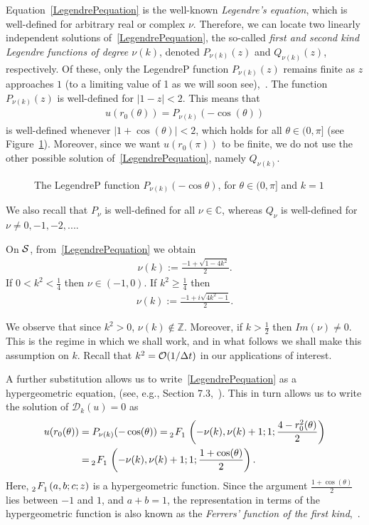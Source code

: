 Equation~\eqref{LegendrePequation} is the well-known {\it Legendre's
equation}, which is well-defined for arbitrary real or complex $\nu$.
Therefore, we can locate two linearly independent solutions
of~\eqref{LegendrePequation}, the so-called {\it first and second kind
Legendre functions of degree $\nu(k)$}, denoted $ P_{\nu(k)}(z)$ and
$Q_{\nu(k)}(z)$, respectively. Of these, only the  LegendreP function
$P_{\nu(k)}(z)$ remains finite as $z$ approaches $1$ (to a limiting
value of 1 as we will soon see),~\cite{lebedev}.  The function
$P_{\nu(k)}(z)$ is well-defined for $|1-z|<2$.  This means that
\begin{align*}
  u(r_0(\theta)) =  P_{\nu(k)}(-\cos(\theta))
\end{align*}
is well-defined whenever $|1+\cos(\theta)|<2$, which holds for all
$\theta \in(0,\pi]$ (see Figure~\ref{f:legendreP}).  Moreover, since we
want $u(r_0(\pi))$ to be finite, we do not use the other possible
solution of~\eqref{LegendrePequation}, namely $Q_{\nu(k)}$.
\begin{figure}[htps]
  \centering
  
  \caption{\label{f:legendreP} The LegendreP function
  $P_{\nu(k)}(-\cos\theta)$, for $\theta \in (0,\pi]$ and $k=1$}
\end{figure}  
We also recall that $P_{\nu}$ is well-defined for all $\nu \in
\mathbb{C}$, whereas $Q_\nu$ is well-defined for $\nu \not=
0,-1,-2,...$. 

On $\S$, from~\eqref{LegendrePequation} we obtain
\begin{align*}  
  \nu(k):=\frac{-1+\sqrt{1-4k^2}}{2}.
\end{align*}
If $0<k^2<\frac{1}{4}$ then $\nu \in (-1,0)$. If $k^2\geq\frac{1}{4}$ then 
\begin{align*}  
  \nu(k):=\frac{-1+i\sqrt{4k^2-1}}{2}.
\end{align*}

We observe that since $k^{2}>0$, $\nu(k) \notin \mathbb{Z}$. Moreover,
if $k>\frac{1}{2}$ then $Im(\nu)\not=0$. This is the regime in which we
shall work, and in what follows we shall make this assumption on $k$.
Recall that $k^{2} = \bigO(1/\Delta t)$ in our applications of interest.

A further substitution allows us to write~\eqref{LegendrePequation} as
a hypergeometric equation, (see, e.g., Section 7.3,~\cite{lebedev}).
This in turn allows us to write the solution of $\mathcal{D}_k(u)=0$ as 
\begin{align*} 
  u(r_0(\theta)) &= P_{\nu(k)}(-\cos(\theta)) = 
    \tensor[_2]{F}{_1}\left(-\nu(k), \nu(k)+  1; 1; 
      \frac{4-r_0^2(\theta)}{2}\right) \\
    &=\tensor[_2]{F}{_1}\left(-\nu(k), \nu(k)+  1; 1;
    \frac{1+\cos(\theta)}{2}\right).
\end{align*} 
Here, $\tensor[_2]{F}{_1}(a,b;c;z)$ is a hypergeometric function. Since
the argument $\frac{1+\cos(\theta)}{2}$ lies between $-1$ and $1$, and
$a+b = 1$, the representation in terms of the hypergeometric function is
also known as the {\it Ferrers' function of the first
kind},~\cite{fatAbramowitz}. 

